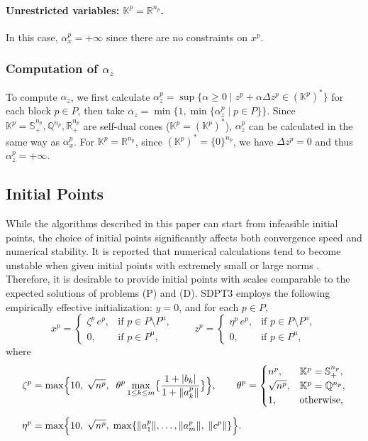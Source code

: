 \paragraph{Unrestricted variables: $\mathbb{K}^p = \mathbb{R}^{n_p}$.}
In this case, $\alpha^p_x = +\infty$ since there are no constraints on $x^p$.


\subsubsection{Computation of $\alpha_z$}
To compute $\alpha_z$, we first calculate $\alpha^p_z = \sup\{\alpha \geq 0 \mid z^p + \alpha\Delta z^p \in (\mathbb{K}^p)^*\}$ for each block $p \in P$, then take $\alpha_z=\min\{1, \min\{\alpha^p_z \mid p \in P\}\}$.
Since $\mathbb{K}^p=\mathbb{S}^{n_p}_+,\mathbb{Q}^{n_p},\mathbb{R}^{n_p}_+$ are self-dual cones ($\mathbb{K}^p = (\mathbb{K}^p)^*$), $\alpha^p_z$ can be calculated in the same way as $\alpha^p_x$.
For $\mathbb{K}^p=\mathbb{R}^{n_p}$, since $(\mathbb{K}^p)^*=\{0\}^{n_p}$, we have $\Delta z^p = 0$ and thus $\alpha^p_z=+\infty$.


\subsection{Initial Points}
\label{sec:initial_points}
While the algorithms described in this paper can start from infeasible initial points, the choice of initial points significantly affects both convergence speed and numerical stability.
It is reported that numerical calculations tend to become unstable when given initial points with extremely small or large norms \cite{toh1999}.
Therefore, it is desirable to provide initial points with scales comparable to the expected solutions of problems (P) and (D).
SDPT3 employs the following empirically effective initialization: $y = 0$, and for each $p\in P$,
\[
    x^p = \begin{cases}
        \zeta^p\, e^p, & \text{if } p \in P \setminus P^{\text{u}},\\
        0, & \text{if } p\in P^{\text{u}},
    \end{cases}
    \quad
    \quad 
    z^p = \begin{cases}
        \eta^p\, e^p, & \text{if } p \in P \setminus P^{\text{u}},\\
        0, & \text{if } p\in P^{\text{u}},
    \end{cases}
\]
where
\begin{align*}
    \zeta^p 
    &= \max\Bigl\{
       10,\;\sqrt{n^p},\;\;\theta^p \max_{1 \le k \le m}\bigl\{\frac{1 + |b_k|}{1 + \|a^p_k\|}\bigr\}
      \Bigr\},
    \quad
    \quad
    \theta^p = \begin{cases}
        n^p, & \mathbb{K}^p = \mathbb{S}^{n_p}_+,\\
        \sqrt{n^p}, & \mathbb{K}^p = \mathbb{Q}^{n_p},\\
        1, & \text{otherwise},
    \end{cases}
    \\[6pt]
    \eta^p 
    &= \max\Bigl\{
       10,\;\sqrt{n^p},\;\max\{\|a^p_1\|,\ldots,\|a^p_m\|,\;\|c^p\|\}
      \Bigr\}.
\end{align*}



